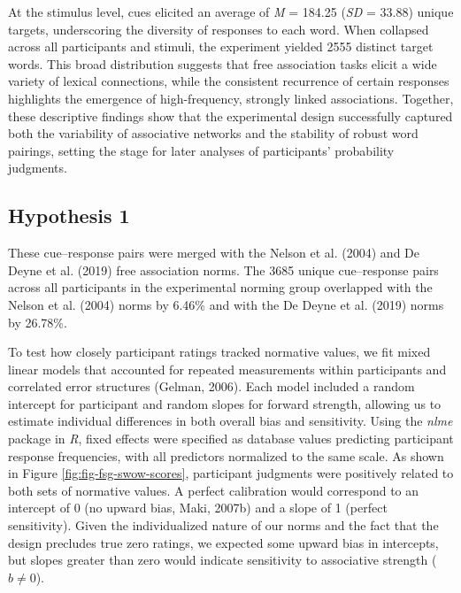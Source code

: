 \documentclass[
  man,floatsintext]{apa7}
\begin{document}
At the stimulus level, cues elicited an average of \emph{M} =
184.25 (\emph{SD} =
33.88) unique targets,
underscoring the diversity of responses to each word. When collapsed
across all participants and stimuli, the experiment yielded
2555 distinct
target words. This broad distribution suggests that free association
tasks elicit a wide variety of lexical connections, while the consistent
recurrence of certain responses highlights the emergence of
high-frequency, strongly linked associations. Together, these
descriptive findings show that the experimental design successfully
captured both the variability of associative networks and the stability
of robust word pairings, setting the stage for later analyses of
participants' probability judgments.

\subsection{Hypothesis 1}\label{hypothesis-1}

These cue--response pairs were merged with the Nelson et al. (2004) and
De Deyne et al. (2019) free association norms. The 3685 unique
cue--response pairs across all participants in the experimental norming
group overlapped with the Nelson et al. (2004) norms by
6.46\% and with the
De Deyne et al. (2019) norms by 26.78\%.

To test how closely participant ratings tracked normative values, we fit
mixed linear models that accounted for repeated measurements within
participants and correlated error structures (Gelman, 2006). Each model
included a random intercept for participant and random slopes for
forward strength, allowing us to estimate individual differences in both
overall bias and sensitivity. Using the \emph{nlme} package in \emph{R}, fixed
effects were specified as database values predicting participant
response frequencies, with all predictors normalized to the same scale.
As shown in Figure \ref{fig:fig-fsg-swow-scores}, participant judgments
were positively related to both sets of normative values. A perfect
calibration would correspond to an intercept of 0 (no upward bias, Maki, 2007b) and a slope of 1 (perfect sensitivity). Given the
individualized nature of our norms and the fact that the design
precludes true zero ratings, we expected some upward bias in intercepts,
but slopes greater than zero would indicate sensitivity to associative
strength (\(b \ne 0\)).
\end{document}
